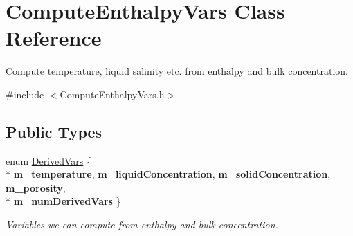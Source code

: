 \hypertarget{class_compute_enthalpy_vars}{\section{Compute\-Enthalpy\-Vars Class Reference}
\label{class_compute_enthalpy_vars}
}


Compute temperature, liquid salinity etc. from enthalpy and bulk concentration.  




{\ttfamily \#include $<$Compute\-Enthalpy\-Vars.\-h$>$}

\subsection*{Public Types}
\begin{DoxyCompactItemize}
\item 
enum \hyperlink{class_compute_enthalpy_vars_aea6509e7a3611ed9cc9c36564269889a}{Derived\-Vars} \{ \\*
{\bfseries m\-\_\-temperature}, 
{\bfseries m\-\_\-liquid\-Concentration}, 
{\bfseries m\-\_\-solid\-Concentration}, 
{\bfseries m\-\_\-porosity}, 
\\*
{\bfseries m\-\_\-num\-Derived\-Vars}
 \}
\begin{DoxyCompactList}\small\item\em Variables we can compute from enthalpy and bulk concentration. \end{DoxyCompactList}\end{DoxyCompactItemize}
